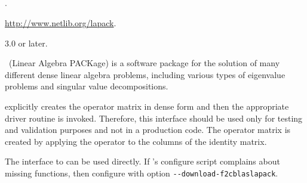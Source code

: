 \subsection*{\underline{\lapack}}
	\begin{description}
	\setlength{\itemsep}{0pt}
	\item[References.]\citep{Anderson:1992:LUG}.
	\item[Website.] \url{http://www.netlib.org/lapack}.
	\item[Version.] 3.0 or later.
	\item[Summary.] \lapack\ (Linear Algebra PACKage) is a software package for the solution of many different dense linear algebra problems, including various types of eigenvalue problems and singular value decompositions.

	\slepc explicitly creates the operator matrix in dense form and then the appropriate \lapack driver routine is invoked. Therefore, this interface should be used only for testing and validation purposes and not in a production code. The operator matrix is created by applying the operator to the columns of the identity matrix.

	\item[Installation.]
	The \slepc interface to \lapack can be used directly. If \slepc's configure script complains about missing \lapack functions, then configure \petsc with option \texttt{-{}-download-f2cblaslapack}.
	\end{description}

